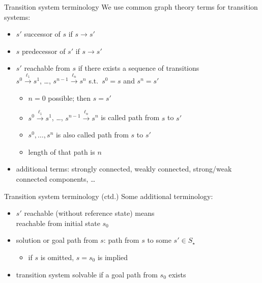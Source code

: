 \documentclass{gkibeamer}
\begin{document}
\begin{frame}{Transition system terminology}
  We use common graph theory terms for transition systems:
  \begin{itemize}
  \item $s'$ \alert{successor} of $s$ if $s \rightarrow s'$
  \item $s$ \alert{predecessor} of $s'$ if $s \rightarrow s'$
  \item $s'$ \alert{reachable} from $s$ if there exists a sequence of
    transitions \\
    $s^{0} \xrightarrow{\ell_1} s^{1}$, \dots,
    $s^{n-1} \xrightarrow{\ell_n} s^{n}$
    s.t.\ $s^{0} = s$ and $s^{n} = s'$%
    \begin{itemize}
    \item {} $n = 0$ possible; then $s = s'$
    \item $s^{0} \xrightarrow{\ell_1} s^{1}$, \dots, $s^{n-1}
      \xrightarrow{\ell_n} s^{n}$ is called \alert{path} from $s$ to
      $s'$
    \item $s^{0}, \dots, s^{n}$ is also called \alert{path} from
      $s$ to $s'$
    \item \alert{length} of that path is $n$
    \end{itemize}
  \item additional terms: \alert{strongly connected}, \alert{weakly
    connected}, \alert{strong/weak connected components}, \dots
  \end{itemize}
\end{frame}

\begin{frame}{Transition system terminology (ctd.)}
  Some additional terminology:
  \begin{itemize}
  \item $s'$ \alert{reachable} (without reference state) means \\
    reachable from initial state $s_0$
  \item \alert{solution} or \alert{goal path} from $s$:
    path from $s$ to some $s' \in S_\star$
    \begin{itemize}
    \item if $s$ is omitted, $s = s_0$ is implied
    \end{itemize}
  \item transition system \alert{solvable} if a goal path from $s_0$
    exists
  \end{itemize}
\end{frame}
\end{document}
